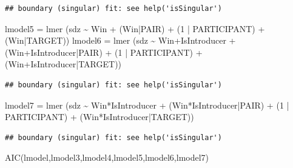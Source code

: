 \documentclass[
]{article}
\newenvironment{Shaded}{\begin{snugshade}}{\end{snugshade}}
\newcommand{\DecValTok}[1]{\textcolor[rgb]{0.00,0.00,0.81}{#1}}
\newcommand{\FunctionTok}[1]{\textcolor[rgb]{0.00,0.00,0.00}{#1}}
\newcommand{\NormalTok}[1]{#1}
\newcommand{\OtherTok}[1]{\textcolor[rgb]{0.56,0.35,0.01}{#1}}
\newcommand{\SpecialCharTok}[1]{\textcolor[rgb]{0.00,0.00,0.00}{#1}}
\begin{document}
\begin{verbatim}
## boundary (singular) fit: see help('isSingular')
\end{verbatim}

\begin{Shaded}
\begin{Highlighting}[]
\NormalTok{lmodel5 }\OtherTok{=}  \FunctionTok{lmer}\NormalTok{ (sdz }\SpecialCharTok{\textasciitilde{}}\NormalTok{   Win }\SpecialCharTok{+}\NormalTok{ (Win}\SpecialCharTok{|}\NormalTok{PAIR) }\SpecialCharTok{+}\NormalTok{ (}\DecValTok{1} \SpecialCharTok{|}\NormalTok{ PARTICIPANT) }\SpecialCharTok{+}\NormalTok{ (Win}\SpecialCharTok{|}\NormalTok{TARGET))}
\NormalTok{lmodel6 }\OtherTok{=}  \FunctionTok{lmer}\NormalTok{ (sdz }\SpecialCharTok{\textasciitilde{}}\NormalTok{   Win}\SpecialCharTok{+}\NormalTok{IsIntroducer }\SpecialCharTok{+}\NormalTok{ (Win}\SpecialCharTok{+}\NormalTok{IsIntroducer}\SpecialCharTok{|}\NormalTok{PAIR) }\SpecialCharTok{+}\NormalTok{ (}\DecValTok{1} \SpecialCharTok{|}\NormalTok{ PARTICIPANT) }\SpecialCharTok{+}\NormalTok{ (Win}\SpecialCharTok{+}\NormalTok{IsIntroducer}\SpecialCharTok{|}\NormalTok{TARGET))}
\end{Highlighting}
\end{Shaded}

\begin{verbatim}
## boundary (singular) fit: see help('isSingular')
\end{verbatim}

\begin{Shaded}
\begin{Highlighting}[]
\NormalTok{lmodel7 }\OtherTok{=}  \FunctionTok{lmer}\NormalTok{ (sdz }\SpecialCharTok{\textasciitilde{}}\NormalTok{   Win}\SpecialCharTok{*}\NormalTok{IsIntroducer }\SpecialCharTok{+}\NormalTok{ (Win}\SpecialCharTok{*}\NormalTok{IsIntroducer}\SpecialCharTok{|}\NormalTok{PAIR) }\SpecialCharTok{+}\NormalTok{ (}\DecValTok{1} \SpecialCharTok{|}\NormalTok{ PARTICIPANT) }\SpecialCharTok{+}\NormalTok{ (Win}\SpecialCharTok{*}\NormalTok{IsIntroducer}\SpecialCharTok{|}\NormalTok{TARGET))}
\end{Highlighting}
\end{Shaded}

\begin{verbatim}
## boundary (singular) fit: see help('isSingular')
\end{verbatim}

\begin{Shaded}
\begin{Highlighting}[]
\FunctionTok{AIC}\NormalTok{(lmodel,lmodel3,lmodel4,lmodel5,lmodel6,lmodel7)}
\end{Highlighting}
\end{Shaded}
\end{document}
